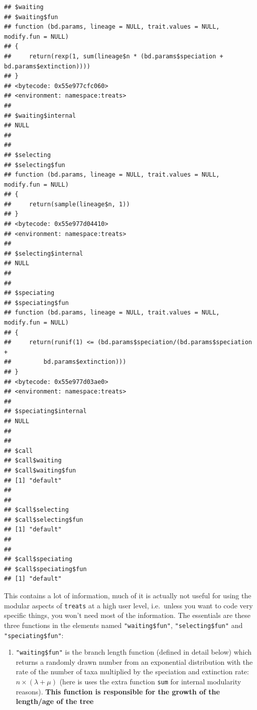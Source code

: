 \documentclass[
]{book}
\newenvironment{Shaded}{\begin{snugshade}}{\end{snugshade}}
\newcommand{\DecValTok}[1]{\textcolor[rgb]{0.00,0.00,0.81}{#1}}
\newcommand{\KeywordTok}[1]{\textcolor[rgb]{0.13,0.29,0.53}{\textbf{#1}}}
\newcommand{\NormalTok}[1]{#1}
\newcommand{\OperatorTok}[1]{\textcolor[rgb]{0.81,0.36,0.00}{\textbf{#1}}}
\newcommand{\StringTok}[1]{\textcolor[rgb]{0.31,0.60,0.02}{#1}}
\providecommand{\tightlist}{%
  \setlength{\itemsep}{0pt}\setlength{\parskip}{0pt}}
\begin{document}
\begin{verbatim}
## $waiting
## $waiting$fun
## function (bd.params, lineage = NULL, trait.values = NULL, modify.fun = NULL) 
## {
##     return(rexp(1, sum(lineage$n * (bd.params$speciation + bd.params$extinction))))
## }
## <bytecode: 0x55e977cfc060>
## <environment: namespace:treats>
## 
## $waiting$internal
## NULL
## 
## 
## $selecting
## $selecting$fun
## function (bd.params, lineage = NULL, trait.values = NULL, modify.fun = NULL) 
## {
##     return(sample(lineage$n, 1))
## }
## <bytecode: 0x55e977d04410>
## <environment: namespace:treats>
## 
## $selecting$internal
## NULL
## 
## 
## $speciating
## $speciating$fun
## function (bd.params, lineage = NULL, trait.values = NULL, modify.fun = NULL) 
## {
##     return(runif(1) <= (bd.params$speciation/(bd.params$speciation + 
##         bd.params$extinction)))
## }
## <bytecode: 0x55e977d03ae0>
## <environment: namespace:treats>
## 
## $speciating$internal
## NULL
## 
## 
## $call
## $call$waiting
## $call$waiting$fun
## [1] "default"
## 
## 
## $call$selecting
## $call$selecting$fun
## [1] "default"
## 
## 
## $call$speciating
## $call$speciating$fun
## [1] "default"
\end{verbatim}

This contains a lot of information, much of it is actually not useful for using the modular aspects of \texttt{treats} at a high user level, i.e.~unless you want to code very specific things, you won't need most of the information. The essentials are these three functions in the elements named \texttt{"waiting\$fun"}, \texttt{"selecting\$fun"} and \texttt{"speciating\$fun"}:

\begin{enumerate}
\def\labelenumi{\arabic{enumi}.}
\tightlist
\item
  \texttt{"waiting\$fun"} is the branch length function (defined in detail below) which returns a randomly drawn number from an exponential distribution with the rate of the number of taxa multiplied by the speciation and extinction rate: \(n \times (\lambda + \mu)\) (here is uses the extra function \texttt{sum} for internal modularity reasons). \textbf{This function is responsible for the growth of the length/age of the tree}
\end{enumerate}

\begin{Shaded}
\end{Shaded}
\end{document}
